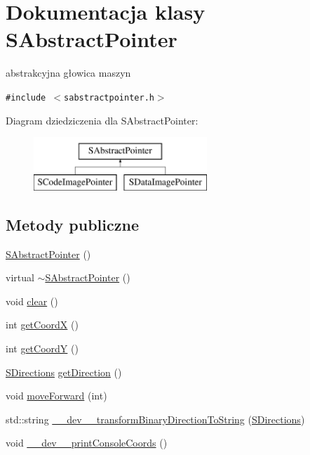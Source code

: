 \hypertarget{classSAbstractPointer}{
\section{Dokumentacja klasy SAbstractPointer}
\label{classSAbstractPointer}
}
abstrakcyjna głowica maszyn  


{\tt \#include $<$sabstractpointer.h$>$}

Diagram dziedziczenia dla SAbstractPointer:\begin{figure}[H]
\begin{center}
\leavevmode
\includegraphics[height=2cm]{classSAbstractPointer}
\end{center}
\end{figure}
\subsection*{Metody publiczne}
\begin{CompactItemize}
\item 
\hyperlink{classSAbstractPointer_9281c3dba0da68460fa87bd17bd768b4}{SAbstractPointer} ()
\item 
virtual \hyperlink{classSAbstractPointer_9973354ecf610b3d48170dd70f0b22ce}{$\sim$SAbstractPointer} ()
\item 
void \hyperlink{classSAbstractPointer_bb15625597bfe9f3927cdc360214bc55}{clear} ()
\item 
int \hyperlink{classSAbstractPointer_0e44b215ff78c8315a4fc4dc12cd4049}{getCoordX} ()
\item 
int \hyperlink{classSAbstractPointer_0226e83b6f838f3ee8491915b9ebab74}{getCoordY} ()
\item 
\hyperlink{senums_8h_039d4115103dc22e0555ecc968fecbf0}{SDirections} \hyperlink{classSAbstractPointer_97b784c62799ff8969483b137bbb2ab5}{getDirection} ()
\item 
void \hyperlink{classSAbstractPointer_c4655988c5ae9f94a00e3ccd0ed14863}{moveForward} (int)
\item 
std::string \hyperlink{classSAbstractPointer_5d7349c25205be738561fa791a77a3b8}{\_\-\_\-dev\_\-\_\-transformBinaryDirectionToString} (\hyperlink{senums_8h_039d4115103dc22e0555ecc968fecbf0}{SDirections})
\item 
void \hyperlink{classSAbstractPointer_3faa92c6a0de5ea971a7d32ceb51980f}{\_\-\_\-dev\_\-\_\-printConsoleCoords} ()
\end{CompactItemize}
